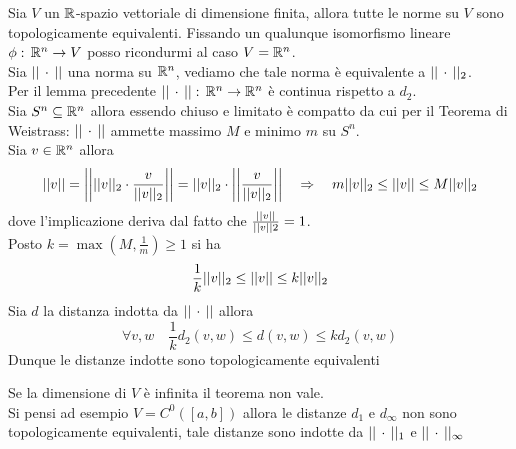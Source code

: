 \begin{thm}Sia $V$ un $\mathbb{R}$-spazio vettoriale di dimensione finita, allora tutte le norme su $V$ sono topologicamente equivalenti.
\proof Fissando un qualunque isomorfismo lineare $\phi:\, \mathbb{R}^n \to V$ posso ricondurmi al caso $V=\mathbb{R}^n$.\\
Sia $\vert \vert \, \cdot \, \vert \vert$ una norma su $\mathbb{R}^n$, vediamo che tale norma \`e equivalente a $\vert \vert \, \cdot \, \vert \vert_2$.\\
Per il lemma precedente $\vert \vert \, \cdot \, \vert \vert:\, \mathbb{R}^n \to \mathbb{R}^n$ \`e continua rispetto a $d_2$.\\
Sia $S^n \subseteq \mathbb{R}^n$ allora essendo chiuso e limitato \`e compatto da cui per il Teorema di Weistrass: $\vert \vert \, \cdot \, \vert \vert $ ammette massimo $M$ e minimo $m$ su $S^n$.\\
Sia $v \in \mathbb{R}^n$ allora $$ \vert \vert v \vert \vert  = \left\vert \left\vert \vert \vert v \vert \vert_2 \cdot \frac{v}{\vert \vert v \vert \vert_2} \right\vert \right\vert = \vert \vert v \vert \vert_2 \cdot \left\vert \left\vert \frac{v}{\vert \vert v \vert \vert_2} \right\vert \right\vert \quad \Rightarrow \quad m \vert \vert v \vert \vert_2 \leq \vert \vert v \vert \vert \leq M \vert \vert v \vert \vert_2$$
dove l'implicazione deriva dal fatto che $\frac{\vert \vert v \vert \vert}{\vert \vert v \vert \vert 2}=1$.\\
Posto $k=\max \left( M, \frac{1}{m}\right)\geq 1 $ si ha 
$$ \frac{1}{k} \vert \vert v \vert \vert_2 \leq \vert \vert v \vert \vert \leq k \vert \vert v \vert \vert_2 $$
Sia $d$ la distanza indotta da $\vert \vert \, \cdot \, \vert \vert$ allora
$$\forall v, w \quad  \frac{1}{k} d_2(v,w) \leq d(v,w) \leq k d_2(v,w)$$ 
Dunque le distanze indotte sono topologicamente equivalenti \endproof
\begin{oss}Se la dimensione di $V$ \`e infinita il teorema non vale.\\
Si pensi ad esempio $V=C^0([a,b])$ allora le distanze $d_1$ e $d_\infty$ non sono topologicamente equivalenti, tale distanze sono indotte da $\vert \vert \, \cdot \, \vert \vert_1$ e $\vert \vert \, \cdot \, \vert \vert_\infty$
\end{oss}
\end{thm}
\newpage
